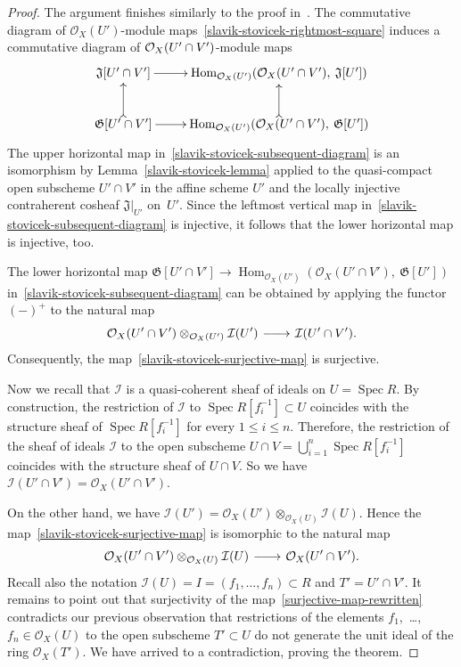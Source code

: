 \documentclass[12pt,a4paper]{amsart}
\newcommand{\+}{\nobreakdash-}
\renewcommand{\:}{\colon}
\newcommand{\rarrow}{\longrightarrow}
\newcommand{\ot}{\otimes}
\newcommand{\lrarrow}{\mskip.5\thinmuskip\relbar\joinrel\relbar
   \joinrel\rightarrow\mskip.5\thinmuskip\relax}
\DeclareMathOperator{\Hom}{Hom}
\DeclareMathOperator{\Spec}{Spec}
\newcommand{\cO}{\mathcal O}
\newcommand{\cI}{\mathcal I}
\newcommand{\fG}{\mathfrak G}
\newcommand{\fJ}{\mathfrak J}
\theoremstyle{plain}
\theoremstyle{definition}
\begin{document}
\begin{proof}
 The argument finishes similarly to the proof in~\cite{SS}.
 The commutative diagram of $\cO_X(U')$\+module
maps~\eqref{slavik-stovicek-rightmost-square} induces a commutative
diagram of $\cO_X(U'\cap\nobreak V')$\+module maps
\begin{equation} \label{slavik-stovicek-subsequent-diagram}
\begin{gathered}
 \xymatrix{
  \fJ[U'\cap V'] \ar[r]
   & \Hom_{\cO_X(U')}(\cO_X(U'\cap V'),\>\fJ[U']) \\
  \fG[U'\cap V'] \ar@{>->}[u] \ar[r]
   & \Hom_{\cO_X(U')}(\cO_X(U'\cap V'),\>\fG[U']) \ar@{>->}[u]
 }
\end{gathered}
\end{equation}
 The upper horizontal map in~\eqref{slavik-stovicek-subsequent-diagram}
is an isomorphism by Lemma~\ref{slavik-stovicek-lemma} applied to
the quasi-compact open subscheme $U'\cap V'$ in the affine scheme $U'$
and the locally injective contraherent cosheaf $\fJ|_{U'}$ on~$U'$.
 Since the leftmost vertical map
in~\eqref{slavik-stovicek-subsequent-diagram} is injective, it follows
that the lower horizontal map is injective, too.

 The lower horizontal map $\fG[U'\cap V']\rarrow
\Hom_{\cO_X(U')}(\cO_X(U'\cap V'),\>\fG[U'])$
in~\eqref{slavik-stovicek-subsequent-diagram} can be obtained by
applying the functor $({-})^+$ to the natural map
\begin{equation} \label{slavik-stovicek-surjective-map}
 \cO_X(U'\cap V')\ot_{\cO_X(U')}\cI(U')\lrarrow\cI(U'\cap V').
\end{equation}
 Consequently, the map~\eqref{slavik-stovicek-surjective-map} is
surjective.

 Now we recall that $\cI$ is a quasi-coherent sheaf of ideals on
$U=\Spec R$.
 By construction, the restriction of $\cI$ to $\Spec R[f_i^{-1}]
\subset U$ coincides with the structure sheaf of $\Spec R[f_i^{-1}]$
for every $1\le i\le n$.
 Therefore, the restriction of the sheaf of ideals $\cI$ to
the open subscheme $U\cap V=\bigcup_{i=1}^n\Spec R[f_i^{-1}]$
coincides with the structure sheaf of $U\cap V$.
 So we have $\cI(U'\cap V')=\cO_X(U'\cap V')$.

 On the other hand, we have $\cI(U')=\cO_X(U')\ot_{\cO_X(U)}\cI(U)$.
 Hence the map~\eqref{slavik-stovicek-surjective-map} is isomorphic
to the natural map
\begin{equation} \label{surjective-map-rewritten}
 \cO_X(U'\cap V')\ot_{\cO_X(U)}\cI(U)\lrarrow\cO_X(U'\cap V').
\end{equation}
 Recall also the notation $\cI(U)=I=(f_1,\dotsc,f_n)\subset R$
and $T'=U'\cap V'$.
 It remains to point out that surjectivity of
the map~\eqref{surjective-map-rewritten} contradicts our previous
observation that restrictions of the elements $f_1$,~\dots,
$f_n\in\cO_X(U)$ to the open subscheme $T'\subset U$ do not
generate the unit ideal of the ring $\cO_X(T')$.
 We have arrived to a contradiction, proving the theorem.
\end{proof}
\end{document}
